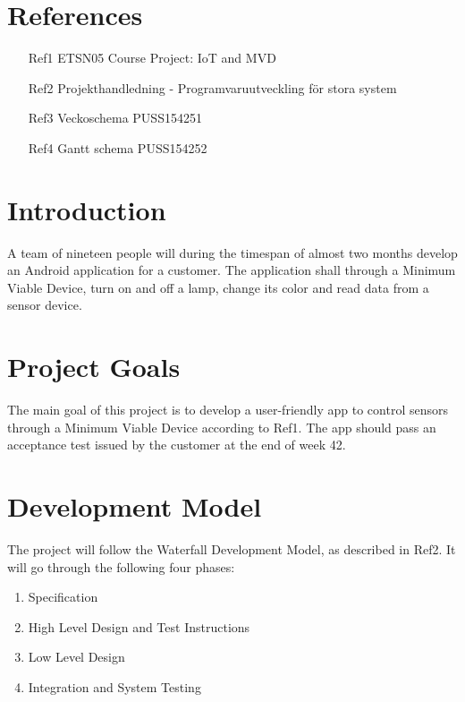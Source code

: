 \documentclass[a4paper]{article}
\begin{document}
\section{References}
\begin{itemize}
\item[Ref1] ETSN05 Course Project: IoT and MVD 
\item[Ref2] Projekthandledning - Programvaruutveckling för stora system 
\item[Ref3] Veckoschema PUSS154251
\item[Ref4] Gantt schema PUSS154252
\end{itemize}


\section{Introduction}
A team of nineteen people will during the timespan of almost two months develop an Android application for a customer. The application shall through a Minimum Viable Device, turn on and off a lamp, change its color and read data from a sensor device.

\section{Project Goals}
The main goal of this project is to develop a user-friendly app to control sensors through a Minimum Viable Device according to  Ref1. The app should pass an acceptance test issued by the customer at the end of week 42. 

\section{Development Model}
The project will follow the Waterfall Development Model, as described in Ref2. It will go through the following four phases:

\begin{enumerate}
\item Specification
\item High Level Design and Test Instructions
\item Low Level Design
\item Integration and System Testing
\end{enumerate}
\end{document}
